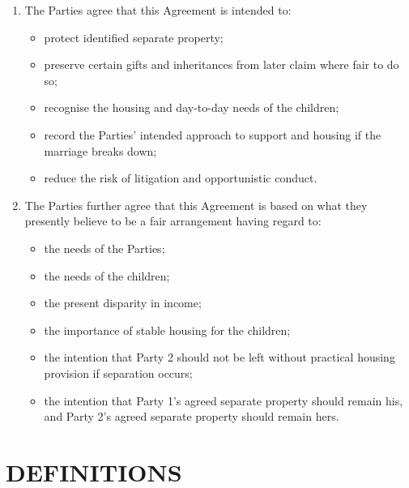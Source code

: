 \documentclass[10pt,a4paper]{article}
\begin{document}
\begin{enumerate}[label=\arabic*., start=15, leftmargin=1.8em]
    \item The Parties agree that this Agreement is intended to:
    \begin{itemize}[leftmargin=1.8em]
        \item protect identified separate property;
        \item preserve certain gifts and inheritances from later claim where fair to do so;
        \item recognise the housing and day-to-day needs of the children;
        \item record the Parties' intended approach to support and housing if the marriage breaks down;
        \item reduce the risk of litigation and opportunistic conduct.
    \end{itemize}
    \item The Parties further agree that this Agreement is based on what they presently believe to be a fair arrangement having regard to:
    \begin{itemize}[leftmargin=1.8em]
        \item the needs of the Parties;
        \item the needs of the children;
        \item the present disparity in income;
        \item the importance of stable housing for the children;
        \item the intention that Party 2 should not be left without practical housing provision if separation occurs;
        \item the intention that Party 1's agreed separate property should remain his, and Party 2's agreed separate property should remain hers.
    \end{itemize}
\end{enumerate}

\section*{DEFINITIONS}
\end{document}
